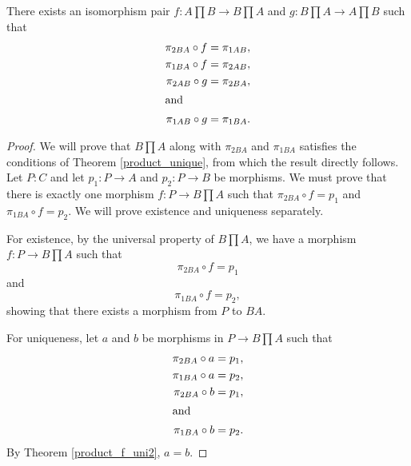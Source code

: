 \documentclass[../../math.tex]{subfiles}
\begin{document}
\begin{theorem} \label{product_comm}
    There exists an isomorphism pair $f : A \prod B \to B \prod A$ and $g : B
    \prod A \to A \prod B$ such that
    \begin{align*}
        \pi_{2BA} \circ f &= \pi_{1AB}, \\
        \pi_{1BA} \circ f &= \pi_{2AB}, \\
        \pi_{2AB} \circ g &= \pi_{2BA}, \\
    \intertext{and}
        \pi_{1AB} \circ g &= \pi_{1BA}.
    \end{align*}
\end{theorem}
\begin{proof}
    We will prove that $B \prod A$ along with $\pi_{2BA}$ and $\pi_{1BA}$
    satisfies the conditions of Theorem \ref{product_unique}, from which the
    result directly follows.  Let $P : C$ and let $p_1 : P \to A$ and $p_2 : P
    \to B$ be morphisms.  We must prove that there is exactly one morphism $f :
    P \to B \prod A$ such that $\pi_{2BA} \circ f = p_1$ and $\pi_{1BA} \circ f
    = p_2$.  We will prove existence and uniqueness separately.

    For existence, by the universal property of $B \prod A$, we have a morphism
    $f : P \to B \prod A$ such that
    \[
        \pi_{2BA} \circ f = p_1
    \]
    and
    \[
        \pi_{1BA} \circ f = p_2,
    \]
    showing that there exists a morphism from $P$ to $BA$.

    For uniqueness, let $a$ and $b$ be morphisms in $P \to B \prod A$ such that
    \begin{align*}
        \pi_{2BA} \circ a &= p_1, \\
        \pi_{1BA} \circ a &= p_2, \\
        \pi_{2BA} \circ b &= p_1, \\
    \intertext{and}
        \pi_{1BA} \circ b &= p_2.
    \end{align*}
    By Theorem \ref{product_f_uni2}, $a = b$.
\end{proof}
\end{document}
